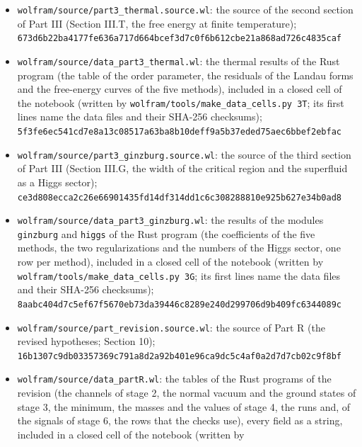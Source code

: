 \documentclass[
  10pt,
]{article}
\begin{document}
\begin{itemize}
  \texttt{8a124c8a2cf1382aa9189b5c2a8d210735cc3aeb19d22afb0bece0d3e184116a}
\item
  \texttt{wolfram/source/part3\_thermal.source.wl}: the source of the
  second section of Part III (Section III.T, the free energy at finite
  temperature);\\
  \texttt{673d6b22ba4177fe636a717d664bcef3d7c0f6b612cbe21a868ad726c4835caf}
\item
  \texttt{wolfram/source/data\_part3\_thermal.wl}: the thermal results
  of the Rust program (the table of the order parameter, the residuals
  of the Landau forms and the free-energy curves of the five methods),
  included in a closed cell of the notebook (written by
  \texttt{wolfram/tools/make\_data\_cells.py\ 3T}; its first lines name
  the data files and their SHA-256 checksums);\\
  \texttt{5f3fe6ec541cd7e8a13c08517a63ba8b10deff9a5b37eded75aec6bbef2ebfac}
\item
  \texttt{wolfram/source/part3\_ginzburg.source.wl}: the source of the
  third section of Part III (Section III.G, the width of the critical
  region and the superfluid as a Higgs sector);\\
  \texttt{ce3d808ecca2c26e66901435fd14df314dd1c6c308288810e925b627e34b0ad8}
\item
  \texttt{wolfram/source/data\_part3\_ginzburg.wl}: the results of the
  modules \texttt{ginzburg} and \texttt{higgs} of the Rust program (the
  coefficients of the five methods, the two regularizations and the
  numbers of the Higgs sector, one row per method), included in a closed
  cell of the notebook (written by
  \texttt{wolfram/tools/make\_data\_cells.py\ 3G}; its first lines name
  the data files and their SHA-256 checksums);\\
  \texttt{8aabc404d7c5ef67f5670eb73da39446c8289e240d299706d9b409fc6344089c}
\item
  \texttt{wolfram/source/part\_revision.source.wl}: the source of Part R
  (the revised hypotheses; Section 10);\\
  \texttt{16b1307c9db03357369c791a8d2a92b401e96ca9dc5c4af0a2d7d7cb02c9f8bf}
\item
  \texttt{wolfram/source/data\_partR.wl}: the tables of the Rust
  programs of the revision (the channels of stage 2, the normal vacuum
  and the ground states of stage 3, the minimum, the masses and the
  values of stage 4, the runs and, of the signals of stage 6, the rows
  that the checks use), every field as a string, included in a closed
  cell of the notebook (written by

\end{itemize}
\end{document}
